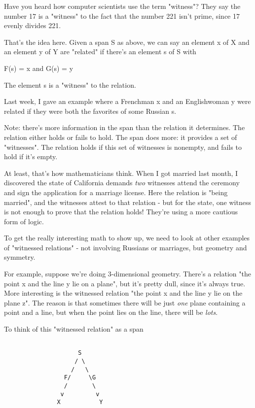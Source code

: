 Have you heard how computer scientists use the term
"witness"?  They say the number 17 is a "witness"
to the fact that the number 221 isn't prime, since 17 evenly divides
221.

That's the idea here.  Given a span S as above, we can say an element
x of X and an element y of Y are "related" if there's an
element s of S with

F(s) = x and G(s) = y

The element s is a "witness" to the relation.  

Last week, I gave an example where a Frenchman x and an Englishwoman y 
were related if they were both the favorites of some Russian s.  

Note: there's more information in the span than the relation it 
determines.  The relation either holds or fails to hold.  The span 
does more: it provides a set of "witnesses".  The relation holds 
if this set of witnesses is nonempty, and fails to hold if it's empty.  

At least, that's how mathematicians think.  When 
I got married last month, I discovered the state of California demands 
\emph{two} witnesses attend the ceremony and sign the application for a 
marriage license.   Here the relation is "being married", and the 
witnesses attest to that relation - but for the state, one witness 
is not enough to prove that the relation holds!  They're using a more 
cautious form of logic.

To get the really interesting math to show up, we need to look at
other examples of "witnessed relations" - not involving Russians
or marriages, but geometry and symmetry.

For example, suppose we're doing 3-dimensional geometry.  There's a
relation "the point x and the line y lie on a plane",
but it's pretty dull, since it's always true.  More interesting is the
witnessed relation "the point x and the line y lie on the plane
z".  The reason is that sometimes there will be just \emph{one} plane
containing a point and a line, but when the point lies on the line,
there will be \emph{lots}.

To think of this "witnessed relation" as a span


\begin{verbatim}

                     S
                    / \
                   /   \
                 F/     \G
                 /       \
                v         v 
               X           Y
\end{verbatim}
    
